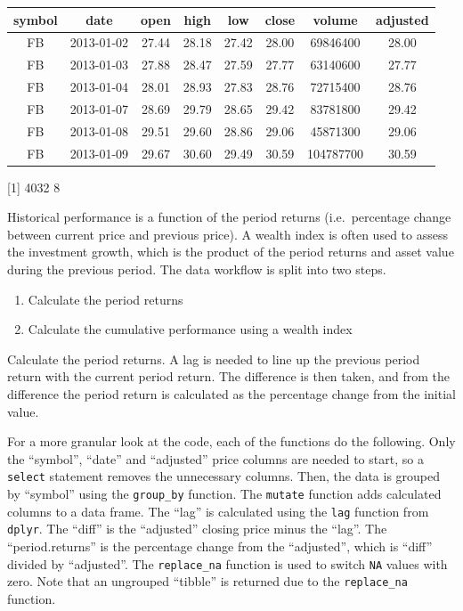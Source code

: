 \begin{tabular}{cccccccc}
\toprule
symbol & date & open & high & low & close & volume & adjusted\\
\midrule
FB & 2013-01-02 & 27.44 & 28.18 & 27.42 & 28.00 & 69846400 & 28.00\\
FB & 2013-01-03 & 27.88 & 28.47 & 27.59 & 27.77 & 63140600 & 27.77\\
FB & 2013-01-04 & 28.01 & 28.93 & 27.83 & 28.76 & 72715400 & 28.76\\
FB & 2013-01-07 & 28.69 & 29.79 & 28.65 & 29.42 & 83781800 & 29.42\\
FB & 2013-01-08 & 29.51 & 29.60 & 28.86 & 29.06 & 45871300 & 29.06\\
FB & 2013-01-09 & 29.67 & 30.60 & 29.49 & 30.59 & 104787700 & 30.59\\
\bottomrule
\end{tabular}

{[}1{]} 4032 8

\hspace{20 mm}

Historical performance is a function of the period returns
(i.e.~percentage change between current price and previous price). A
wealth index is often used to assess the investment growth, which is the
product of the period returns and asset value during the previous
period. The data workflow is split into two steps.

\begin{enumerate}
\def\labelenumi{\arabic{enumi}.}
\tightlist
\item
  Calculate the period returns
\item
  Calculate the cumulative performance using a wealth index
\end{enumerate}

Calculate the period returns. A lag is needed to line up the previous
period return with the current period return. The difference is then
taken, and from the difference the period return is calculated as the
percentage change from the initial value.

For a more granular look at the code, each of the functions do the
following. Only the ``symbol'', ``date'' and ``adjusted'' price columns
are needed to start, so a \texttt{select} statement removes the
unnecessary columns. Then, the data is grouped by ``symbol'' using the
\texttt{group\_by} function. The \texttt{mutate} function adds
calculated columns to a data frame. The ``lag'' is calculated using the
\texttt{lag} function from \texttt{dplyr}. The ``diff'' is the
``adjusted'' closing price minus the ``lag''. The ``period.returns'' is
the percentage change from the ``adjusted'', which is ``diff'' divided
by ``adjusted''. The \texttt{replace\_na} function is used to switch
\texttt{NA} values with zero. Note that an ungrouped ``tibble'' is
returned due to the \texttt{replace\_na} function.

